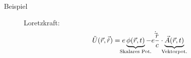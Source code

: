 \begin{enumerate}
\begin{description}
\begin{itemize}
  \begin{description}
  \item[Beispiel] Loretzkraft:
    \begin{align*}
      \tilde{U}(\vec{r},\vec{\dot{r}})
      = e \underbrace{\phi(\vec{r},t)}_{\mathclap{\text{Skalares Pot.}}} - e
      \frac{\dot\vec{r}}{c} \cdot
      \underbrace{\vec{A}(\vec{r},t)}_{\mathclap{\text{Vektorpot.}}} 
    \end{align*}
  \end{description}

\end{itemize}

\end{description}

\end{enumerate}



